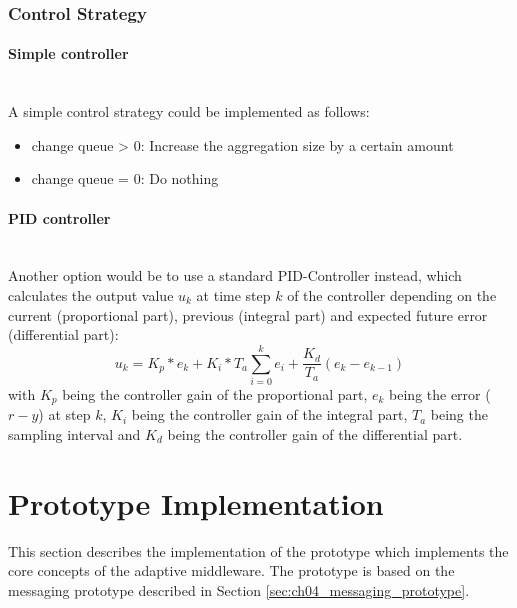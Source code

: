 \subsubsection{Control Strategy}
\label{sec:ch05_control_strategy}

\paragraph{Simple controller}\mbox{}\\
A simple control strategy could be implemented as follows:
\begin{itemize}
	\item change queue > 0: Increase the aggregation size by a certain amount
	\item change queue = 0: Do nothing
\end{itemize}

\paragraph{PID controller}\mbox{}\\
Another option would be to use a standard PID-Controller instead, which calculates the output value $u_k$ at time step $k$ of the controller depending on the current (proportional part), previous (integral part) and expected future error (differential part):
\begin{displaymath}
	u_k=K_p*e_k+K_i*T_a\sum_{i=0}^k e_i+\frac{K_d}{T_a}(e_k-e_{k-1})
\end{displaymath}
with $K_p$ being the controller gain of the proportional part, $e_k$ being the error ($r-y$) at step $k$, $K_i$ being the controller gain of the integral part, $T_a$ being the sampling interval and $K_d$ being the controller gain of the differential part.

\section{Prototype Implementation}
\label{sec:ch05_prototype}

This section describes the implementation of the prototype which implements the core concepts of the adaptive middleware. The prototype is based on the messaging prototype described in Section \ref{sec:ch04_messaging_prototype}.

